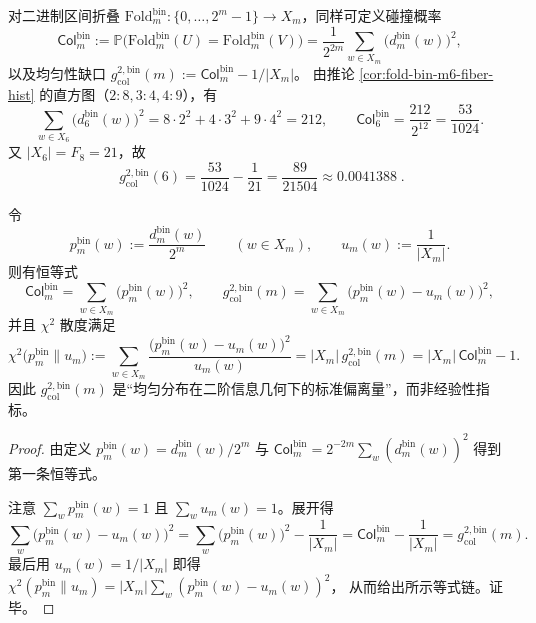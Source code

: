 \begin{remark}[\texorpdfstring{$m=6$}{m=6} 的均匀性缺口数值锚点（bin-fold）]\label{rem:fold-bin-m6-col-gap}
对二进制区间折叠 \(\mathrm{Fold}^{\mathrm{bin}}_m:\{0,\dots,2^m-1\}\to X_m\)，同样可定义碰撞概率
\[
\mathsf{Col}^{\mathrm{bin}}_m:=\mathbb{P}\bigl(\mathrm{Fold}^{\mathrm{bin}}_m(U)=\mathrm{Fold}^{\mathrm{bin}}_m(V)\bigr)
=\frac{1}{2^{2m}}\sum_{w\in X_m}\bigl(d^{\mathrm{bin}}_m(w)\bigr)^2,
\]
以及均匀性缺口
\(
g_{\mathrm{col}}^{2,\mathrm{bin}}(m):=\mathsf{Col}^{\mathrm{bin}}_m-1/|X_m|
\)。
由推论 \ref{cor:fold-bin-m6-fiber-hist} 的直方图（\(2:8,3:4,4:9\)），有
\[
\sum_{w\in X_6}\bigl(d^{\mathrm{bin}}_6(w)\bigr)^2
=8\cdot 2^2+4\cdot 3^2+9\cdot 4^2
=212,
\qquad
\mathsf{Col}^{\mathrm{bin}}_6=\frac{212}{2^{12}}=\frac{53}{1024}.
\]
又 \(|X_6|=F_8=21\)，故
\[
\boxed{\;
g_{\mathrm{col}}^{2,\mathrm{bin}}(6)=\frac{53}{1024}-\frac{1}{21}
=\frac{89}{21504}\approx 0.0041388\; }.
\]
\end{remark}

\begin{proposition}\label{prop:fold-bin-chi2-col}
令
\[
p^{\mathrm{bin}}_m(w):=\frac{d^{\mathrm{bin}}_m(w)}{2^m}\qquad (w\in X_m),
\qquad
u_m(w):=\frac{1}{|X_m|}.
\]
则有恒等式
\[
\mathsf{Col}^{\mathrm{bin}}_m=\sum_{w\in X_m}\bigl(p^{\mathrm{bin}}_m(w)\bigr)^2,
\qquad
g_{\mathrm{col}}^{2,\mathrm{bin}}(m)=\sum_{w\in X_m}\bigl(p^{\mathrm{bin}}_m(w)-u_m(w)\bigr)^2,
\]
并且 \(\chi^2\) 散度满足
\[
\chi^2\!\bigl(p^{\mathrm{bin}}_m\|u_m\bigr)
:=\sum_{w\in X_m}\frac{\bigl(p^{\mathrm{bin}}_m(w)-u_m(w)\bigr)^2}{u_m(w)}
=|X_m|\,g_{\mathrm{col}}^{2,\mathrm{bin}}(m)
=|X_m|\,\mathsf{Col}^{\mathrm{bin}}_m-1.
\]
因此 \(g_{\mathrm{col}}^{2,\mathrm{bin}}(m)\) 是“均匀分布在二阶信息几何下的标准偏离量”，而非经验性指标。
\end{proposition}
\begin{proof}
由定义 \(p^{\mathrm{bin}}_m(w)=d^{\mathrm{bin}}_m(w)/2^m\) 与
\(
\mathsf{Col}^{\mathrm{bin}}_m
=2^{-2m}\sum_{w}(d^{\mathrm{bin}}_m(w))^2
\)
得到第一条恒等式。
\par
注意 \(\sum_w p^{\mathrm{bin}}_m(w)=1\) 且 \(\sum_w u_m(w)=1\)。展开得
\[
\sum_w\bigl(p^{\mathrm{bin}}_m(w)-u_m(w)\bigr)^2
=\sum_w \bigl(p^{\mathrm{bin}}_m(w)\bigr)^2-\frac{1}{|X_m|}
=\mathsf{Col}^{\mathrm{bin}}_m-\frac{1}{|X_m|}
=g_{\mathrm{col}}^{2,\mathrm{bin}}(m).
\]
最后用 \(u_m(w)=1/|X_m|\) 即得
\(
\chi^2(p^{\mathrm{bin}}_m\|u_m)=|X_m|\sum_w(p^{\mathrm{bin}}_m(w)-u_m(w))^2
\)，
从而给出所示等式链。证毕。
\end{proof}

